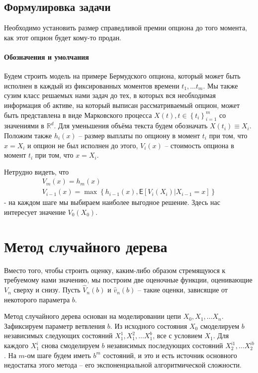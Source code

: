 \documentclass[a4paper,10pt]{article}
\begin{document}
\subsection{Формулировка задачи}
\par Необходимо установить размер справедливой премии опциона до того момента, как этот опцион будет кому-то продан.
\paragraph{Обозначения и умолчания}
\par Будем строить модель на примере Бермудского опциона, который может быть исполнен в каждый из фиксированных моментов времени $t_1, \ldots t_m$. Мы также сузим класс решаемых нами задач до тех, в которых вся необходимая информация об активе, на который выписан рассматриваемый опцион, может быть представлена в виде Марковского процесса $X\left( t \right), t \in \left\lbrace t_i \right\rbrace_{i = 1}^m$ со значениями в $\mathbb{R}^d$. Для уменьшения объёма текста будем обозначать $X\left(t_i\right) \equiv X_i$. Положим также $h_i\left(x\right)$ -- размер выплаты по опциону в момент $t_i$ при том, что $x = X_i$ и опцион не был исполнен до этого, $V_i\left(x\right)$ -- стоимость опциона в момент $t_i$ при том, что $x = X_i$.
\par Нетрудно видеть, что
\begin{eqnarray}\label{eq:option-recursive}
	V_m\left(x\right) = h_m\left(x\right) \\
	V_{i-1}\left(x\right) = \max\left\lbrace h_{i-1}\left(x\right), \mathsf{E}\left[V_i\left(X_i\right)|X_{i-1}=x\right]\right\rbrace
\end{eqnarray} - на каждом шаге мы выбираем наиболее выгодное решение. Здесь нас интересует значение $V_0\left(X_0\right)$.

\section{Метод случайного дерева}
Вместо того, чтобы строить оценку, каким-либо образом стремящуюся к требуемому нами значению, мы построим две оценочные функции, оценивающие $V_n$ сверху и снизу. Пусть $\hat{V}_n\left(b\right)$ и $\hat{v}_n\left(b\right)$ -- такие оценки, зависящие от некоторого параметра $b$.
\par Метод случайного дерева основан на моделировании цепи $X_0, X_1, \ldots X_n$. Зафиксируем параметр ветвления $b$. Из исходного состояния $X_0$ смоделируем $b$ независимых следующих состояний $X_1^1, X_1^2, \ldots X_1^b$, все с условием $X_1$. Для каждого $X_1^i$ снова смоделируем $b$ независимых последующих состояний $X_2^{i1}, \ldots X_2^{ib}$. На $m$-ом шаге будем иметь $b^m$ состояний, и это и есть источник основного недостатка этого метода -- его экспоненциальной алгоритмической сложности.
\end{document}

